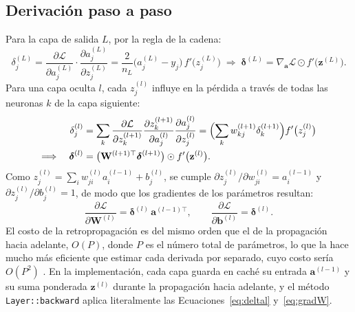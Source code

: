 \subsection{Derivación paso a paso}
Para la capa de salida $L$, por la regla de la cadena:
\begin{equation}
\delta_j^{(L)} = \frac{\partial\mathcal{L}}{\partial a_j^{(L)}}\cdot\frac{\partial a_j^{(L)}}{\partial z_j^{(L)}} = \frac{2}{n_L}\bigl(a_j^{(L)}-y_j\bigr)\, f'\bigl(z_j^{(L)}\bigr)
\;\Longrightarrow\; \boldsymbol{\delta}^{(L)} = \nabla_{\mathbf{a}}\mathcal{L}\odot f'\bigl(\mathbf{z}^{(L)}\bigr).\label{eq:deltaL}
\end{equation}
Para una capa oculta $l$, cada $z_j^{(l)}$ influye en la pérdida a través de todas las neuronas $k$ de la capa siguiente:
\begin{equation}
\begin{split}
\delta_j^{(l)} &= \sum_{k}\frac{\partial\mathcal{L}}{\partial z_k^{(l+1)}}\frac{\partial z_k^{(l+1)}}{\partial a_j^{(l)}}\frac{\partial a_j^{(l)}}{\partial z_j^{(l)}} = \Bigl(\sum_k w_{kj}^{(l+1)}\delta_k^{(l+1)}\Bigr) f'\bigl(z_j^{(l)}\bigr)\\
\Longrightarrow\quad \boldsymbol{\delta}^{(l)} &= \bigl(\mathbf{W}^{(l+1)\top}\boldsymbol{\delta}^{(l+1)}\bigr)\odot f'\bigl(\mathbf{z}^{(l)}\bigr).
\end{split}\label{eq:deltal}
\end{equation}
Como $z_j^{(l)} = \sum_i w_{ji}^{(l)}a_i^{(l-1)} + b_j^{(l)}$, se cumple $\partial z_j^{(l)}/\partial w_{ji}^{(l)} = a_i^{(l-1)}$ y $\partial z_j^{(l)}/\partial b_j^{(l)} = 1$, de modo que los gradientes de los parámetros resultan:
\begin{equation}
\frac{\partial\mathcal{L}}{\partial\mathbf{W}^{(l)}} = \boldsymbol{\delta}^{(l)}\,\mathbf{a}^{(l-1)\top}, \qquad \frac{\partial\mathcal{L}}{\partial\mathbf{b}^{(l)}} = \boldsymbol{\delta}^{(l)}.\label{eq:gradW}
\end{equation}
El costo de la retropropagación es del mismo orden que el de la propagación hacia adelante, $O(P)$, donde $P$ es el número total de parámetros, lo que la hace mucho más eficiente que estimar cada derivada por separado, cuyo costo sería $O(P^2)$ \citep{baydin2018}. En la implementación, cada capa guarda en caché su entrada $\mathbf{a}^{(l-1)}$ y su suma ponderada $\mathbf{z}^{(l)}$ durante la propagación hacia adelante, y el método \texttt{Layer::backward} aplica literalmente las Ecuaciones~\eqref{eq:deltal} y~\eqref{eq:gradW}.

